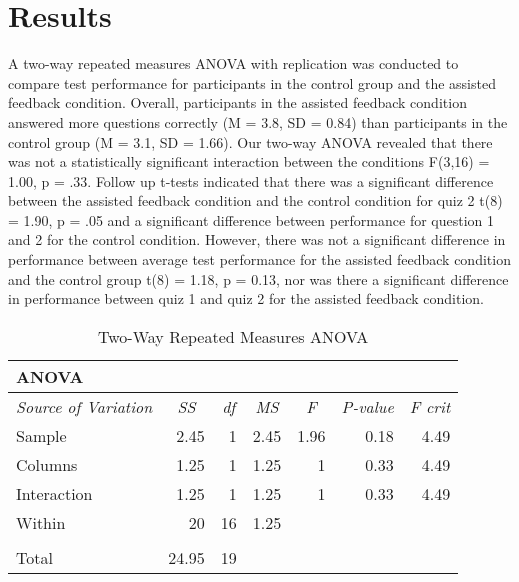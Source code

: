 \documentclass[acmtog]{acmart}
\begin{document}
\section{Results}
A two-way repeated measures ANOVA with replication was conducted to compare test performance for participants in the control group and the assisted feedback condition. Overall, participants in the assisted feedback condition answered more questions correctly (M = 3.8, SD = 0.84) than participants in the control group (M = 3.1, SD = 1.66). Our two-way ANOVA revealed that there was not a statistically significant interaction between the conditions F(3,16) = 1.00, p = .33. Follow up t-tests indicated that there was a significant difference between the assisted feedback condition and the control condition for quiz 2 t(8) = 1.90, p = .05 and a significant difference between performance for question 1 and 2 for the control condition. However, there was not a significant difference in performance between average test performance for the assisted feedback condition and the control group t(8) = 1.18, p = 0.13, nor was there a significant difference in performance between quiz 1 and quiz 2 for the assisted feedback condition.


\begin{table}[htbp]
  \centering
  \caption{Two-Way Repeated Measures ANOVA}
    \begin{tabular}{lrrrrrr}
    ANOVA &       &       &       &       &       &  \\
    \midrule
    \multicolumn{1}{c}{\textit{Source of Variation}} & \multicolumn{1}{c}{\textit{SS}} & \multicolumn{1}{c}{\textit{df}} & \multicolumn{1}{c}{\textit{MS}} & \multicolumn{1}{c}{\textit{F}} & \multicolumn{1}{c}{\textit{P-value}} & \multicolumn{1}{c}{\textit{F crit}} \\
    \midrule
    Sample & 2.45  & 1     & 2.45  & 1.96  & 0.18 & 4.49 \\
    Columns & 1.25  & 1     & 1.25  & 1     & 0.33 & 4.49 \\
    Interaction & 1.25  & 1     & 1.25  & 1     & 0.33 & 4.49 \\
    Within & 20    & 16    & 1.25  &       &       &  \\
          &       &       &       &       &       &  \\
    Total & 24.95 & 19    &       &       &       &  \\
    \bottomrule
    \end{tabular}%
  \label{tab:addlabel}%
\end{table}%
\end{document}
